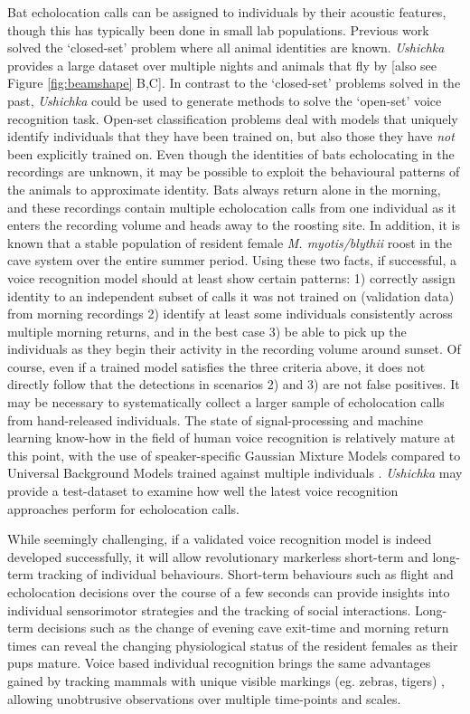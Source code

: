 \documentclass[
]{book}
\begin{document}
Bat echolocation calls can be assigned to individuals by their acoustic features, though this has typically been done in small lab populations. Previous work \citep{masters1995sonar, yovel2009voice} solved the `closed-set' problem where all animal identities are known. \emph{Ushichka} provides a large dataset over multiple nights and animals that fly by {[}also see Figure \ref{fig:beamshape} B,C{]}. In contrast to the `closed-set' problems solved in the past, \emph{Ushichka} could be used to generate methods to solve the `open-set' voice recognition task. Open-set classification problems deal with models that uniquely identify individuals that they have been trained on, but also those they have \emph{not} been explicitly trained on. Even though the identities of bats echolocating in the recordings are unknown, it may be possible to exploit the behavioural patterns of the animals to approximate identity. Bats always return alone in the morning, and these recordings contain multiple echolocation calls from one individual as it enters the recording volume and heads away to the roosting site. In addition, it is known that a stable population of resident female \emph{M. myotis/blythii} roost in the cave system over the entire summer period. Using these two facts, if successful, a voice recognition model should at least show certain patterns: 1) correctly assign identity to an independent subset of calls it was not trained on (validation data) from morning recordings 2) identify at least some individuals consistently across multiple morning returns, and in the best case 3) be able to pick up the individuals as they begin their activity in the recording volume around sunset. Of course, even if a trained model satisfies the three criteria above, it does not directly follow that the detections in scenarios 2) and 3) are not false positives. It may be necessary to systematically collect a larger sample of echolocation calls from hand-released individuals. The state of signal-processing and machine learning know-how in the field of human voice recognition is relatively mature at this point, with the use of speaker-specific Gaussian Mixture Models compared to Universal Background Models trained against multiple individuals \citep{Hennebert2009}. \emph{Ushichka} may provide a test-dataset to examine how well the latest voice recognition approaches perform for echolocation calls.

While seemingly challenging, if a validated voice recognition model is indeed developed successfully, it will allow revolutionary markerless short-term and long-term tracking of individual behaviours. Short-term behaviours such as flight and echolocation decisions over the course of a few seconds can provide insights into individual sensorimotor strategies and the tracking of social interactions. Long-term decisions such as the change of evening cave exit-time and morning return times can reveal the changing physiological status of the resident females as their pups mature. Voice based individual recognition brings the same advantages gained by tracking mammals with unique visible markings (eg. zebras, tigers) \citep{lahiri11_biometric, hiby2009tiger}, allowing unobtrusive observations over multiple time-points and scales.
\end{document}
